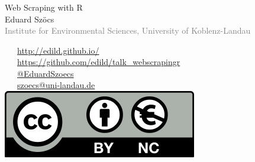 \documentclass[12pt, t]{beamer}
\begin{document}
\begin{frame}
    \frametitle{}

    \vspace{1em}
    \begin{centering}
    \Large \textcolor{title}{Web Scraping with R} \\[1em]
        Eduard Szöcs \\[0.3em]
    \tiny \textcolor{gray}{Institute for Environmental Sciences, University of Koblenz-Landau} \\[5em]
    \end{centering}
    \normalsize
    \textcolor{hilight}{\faLaptop}~~~\href{http://edild.github.io/}{http://edild.github.io/ }\\[.5em]
    \textcolor{hilight}{\faGift}~~~\href{https://github.com/edild/talk_webscrapingr}{https://github.com/edild/talk\_webscrapingr}\\[0.5em]
    \textcolor{hilight}{\faTwitter}~~~\href{http://twitter.com/EduardSzoecs}{@EduardSzoecs}     \\[0.5em]
    \textcolor{hilight}{\faEnvelope}~~~\href{mailto:szoecs@uni-landau.de}{szoecs@uni-landau.de} \\[.5em]
    \hfill \includegraphics[width =.3\textwidth]{fig/Cc-by-nc_euro_icon.png} 
\end{frame}
\end{document}
